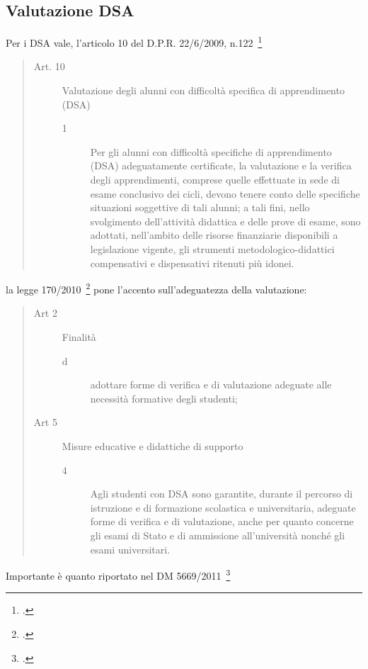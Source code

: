 \subsection{Valutazione DSA}
Per i DSA vale, l'articolo 10 del D.P.R. 22/6/2009, n.122~\footcite{DPR_122_2009}
\begin{quote}
\begin{description}
	\item[Art. 10] Valutazione degli alunni con difficoltà specifica di apprendimento (DSA)
	\begin{description}
		\item[1] Per gli alunni con difficoltà specifiche di apprendimento (DSA) adeguatamente certificate, la valutazione e la verifica degli apprendimenti, comprese quelle effettuate in sede di esame conclusivo dei cicli, devono tenere conto delle specifiche situazioni soggettive di tali alunni; a tali fini, nello svolgimento dell'attività didattica e delle prove di esame, sono adottati, nell'ambito delle risorse finanziarie disponibili a legislazione vigente, gli strumenti metodologico-didattici compensativi e dispensativi ritenuti più idonei.
	\end{description}
\end{description}
\end{quote}
 la legge 170/2010~\footcite{legge170} pone l'accento sull'adeguatezza della valutazione:
\begin{quote}
\begin{description}
	\item[Art 2] Finalità
	\begin{description}
		\item[d] adottare forme di verifica e di valutazione adeguate alle necessità formative degli studenti;
	\end{description}
	\item [Art 5] Misure educative e didattiche di supporto
	\begin{description}
		\item[4] Agli studenti con DSA sono garantite, durante il percorso di istruzione e di formazione scolastica e
		universitaria, adeguate forme di verifica e di valutazione, anche per quanto concerne gli esami di
		Stato e di ammissione all'università nonché gli esami universitari.
	\end{description}
\end{description}
\end{quote}
Importante è quanto riportato nel DM 5669/2011~\footcite{decreto5669_2011}
